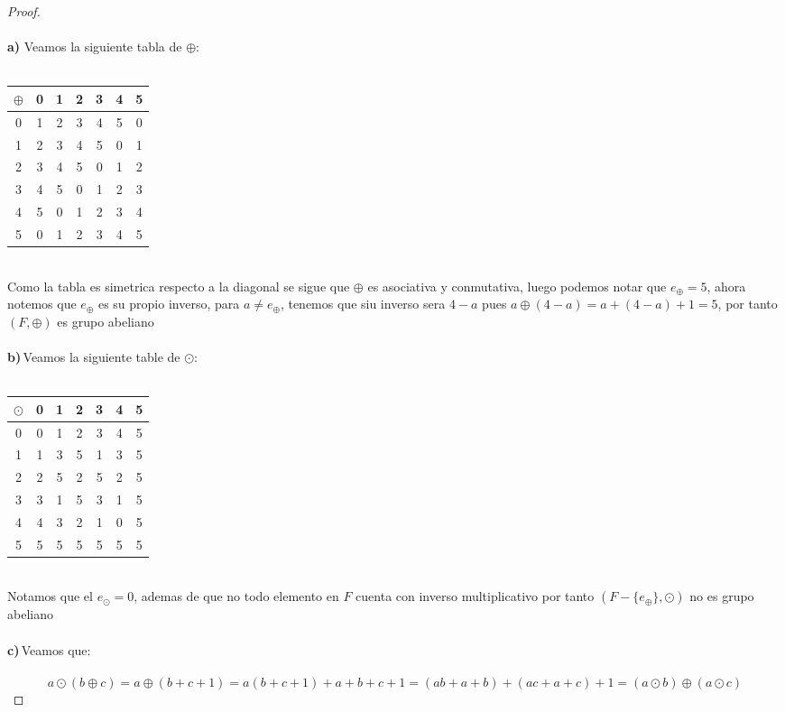 \documentclass[11pt,letterpaper]{article}
\begin{document}
\begin{proof}\,\\
	\,\\
	\textbf{a)}\,\,Veamos la siguiente tabla de $\oplus $:\,\\
	\,\\
	\begin{table}[h!]
		\centering
		 \begin{tabular}{||c c c c c c c||} 
		 \hline
		 $\oplus$ & 0 & 1 & 2 & 3 & 4 &5 \\ [0.5ex] 
		 \hline\hline
		 0 & 1 & 2 & 3 & 4 & 5 &0 \\
		 1& 2 & 3 & 4 & 5 & 0 &1 \\
		 2 & 3 & 4 & 5 & 0 & 1 &2 \\
		 3 & 4 & 5 & 0 & 1 & 2 &3  \\
		 4 & 5 & 0 & 1 & 2 & 3 &4 \\
		 5 & 0 & 1 & 2 & 3 & 4 &5 \\[1ex] 
		 \hline
		 \end{tabular}
		\end{table}
	  \,\\
Como la tabla es simetrica respecto a la diagonal se sigue que $\oplus$ es asociativa y conmutativa, luego podemos notar
que $e_{\oplus}=5$, ahora notemos que $e_{\oplus}$ es su propio inverso, para $a\neq e_{\oplus}$, tenemos que siu inverso sera $4-a$ pues
$a\oplus (4-a)=a+(4-a)+1=5$, por tanto $(F,\oplus)$ es grupo abeliano\,\\
\,\\
\textbf{b)}\,Veamos la siguiente table de $\odot$:\,\\
\,\\
\begin{table}[h!]
	\centering
	 \begin{tabular}{||c c c c c c c||} 
	 \hline
	 $\odot$ & 0 & 1 & 2 & 3 & 4 &5 \\ [0.5ex] 
	 \hline\hline
	 0 & 0 & 1 & 2 & 3 & 4 &5 \\
	 1& 1 & 3 & 5& 1 & 3 &5 \\
	 2 & 2 & 5 & 2 & 5 & 2 &5 \\
	 3 & 3 & 1 & 5 & 3 & 1 &5  \\
	 4 & 4 & 3 & 2 & 1 & 0 &5 \\
	 5 & 5 & 5 & 5 & 5 & 5 &5 \\[1ex] 
	 \hline
	 \end{tabular}
	\end{table}
  \,\\
  Notamos que el $e_{\odot}=0$, ademas de que no todo elemento en $F$ cuenta con inverso multiplicativo
  por tanto $(F-\{e_{\oplus}\},\odot)$ no es grupo abeliano\,\\
  \,\\
  \textbf{c)}\,Veamos que:\,\\
  \,\\
  \begin{equation*}
	a\odot(b\oplus c)=a\oplus(b+c+1)=a(b+c+1)+a+b+c+1=(ab+a+b)+(ac+a+c)+1=(a\odot b)\oplus (a\odot c)
  \end{equation*}
\end{proof}\,\\
\end{document}
